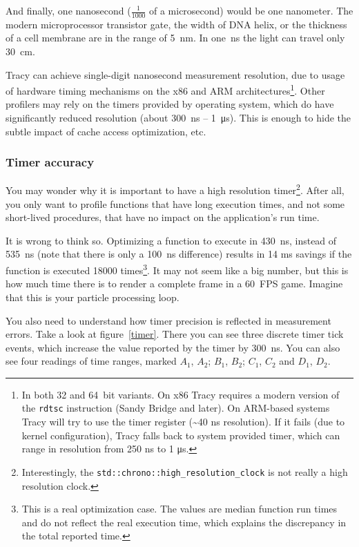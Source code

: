 \documentclass[hidelinks,titlepage,a4paper]{article}
\begin{document}
And finally, one nanosecond ($\frac{1}{1000}$ of a microsecond) would be one nanometer. The modern microprocessor transistor gate, the width of DNA helix, or the thickness of a cell membrane are in the range of 5~\si{\nano\metre}. In one~\si{\nano\second} the light can travel only 30~\si{\centi\meter}.

Tracy can achieve single-digit nanosecond measurement resolution, due to usage of hardware timing mechanisms on the x86 and ARM architectures\footnote{In both 32 and 64~bit variants. On x86 Tracy requires a modern version of the \texttt{rdtsc} instruction (Sandy Bridge and later). On ARM-based systems Tracy will try to use the timer register (\textasciitilde 40 \si{\nano\second} resolution). If it fails (due to kernel configuration), Tracy falls back to system provided timer, which can range in resolution from 250 \si{\nano\second} to 1 \si{\micro\second}.}. Other profilers may rely on the timers provided by operating system, which do have significantly reduced resolution (about 300~\si{\nano\second} -- 1~\si{\micro\second}). This is enough to hide the subtle impact of cache access optimization, etc.

\subsubsection{Timer accuracy}

You may wonder why it is important to have a high resolution timer\footnote{Interestingly, the \texttt{std::chrono::high\_resolution\_clock} is not really a high resolution clock.}. After all, you only want to profile functions that have long execution times, and not some short-lived procedures, that have no impact on the application's run time.

It is wrong to think so. Optimizing a function to execute in 430~\si{\nano\second}, instead of 535~\si{\nano\second} (note that there is only a 100~\si{\nano\second} difference) results in 14 \si{\milli\second} savings if the function is executed 18000 times\footnote{This is a real optimization case. The values are median function run times and do not reflect the real execution time, which explains the discrepancy in the total reported time.}. It may not seem like a big number, but this is how much time there is to render a complete frame in a 60~FPS game. Imagine that this is your particle processing loop.

You also need to understand how timer precision is reflected in measurement errors. Take a look at figure~\ref{timer}. There you can see three discrete timer tick events, which increase the value reported by the timer by 300~\si{\nano\second}. You can also see four readings of time ranges, marked $A_1$, $A_2$; $B_1$, $B_2$; $C_1$, $C_2$ and $D_1$, $D_2$.
\end{document}
